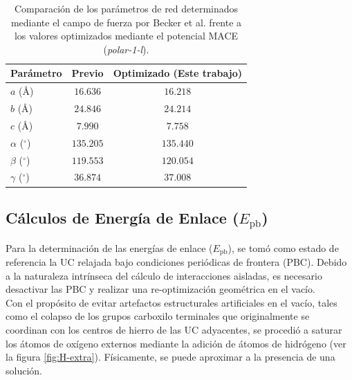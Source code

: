 \documentclass[12pt,letterpaper,oneside]{report}
\begin{document}
\begin{table}[h!]
\centering
\caption{Comparación de los parámetros de red determinados mediante el campo de fuerza por Becker et al. \cite{becker2016bhematin} frente a los valores optimizados mediante el potencial MACE (\textit{polar-1-l}).}
\label{tab:parametros_red}
\begin{tabular}{lcc}
\toprule
\textbf{Parámetro} & \textbf{Previo \cite{becker2016bhematin}} & \textbf{Optimizado (Este trabajo)} \\
\midrule
$a$ (\AA)       & $16.636$ & $16.218$ \\
$b$ (\AA)       & $24.846$ & $24.214$ \\
$c$ (\AA)       & $7.990$ & $7.758$  \\
$\alpha$ ($^\circ$) & $135.205$ & $135.440$ \\
$\beta$ ($^\circ$)  & $119.553$ & $120.054$ \\
$\gamma$ ($^\circ$) & $36.874$ & $37.008$  \\
\bottomrule
\end{tabular}
\end{table}

\subsection{Cálculos de Energía de Enlace ($E_{\text{pb}}$)}
\label{subsec:calculos_epb}

Para la determinación de las energías de enlace ($E_{\text{pb}}$), se tomó como estado de referencia la UC relajada bajo condiciones periódicas de frontera (PBC). Debido a la naturaleza intrínseca del cálculo de interacciones aisladas, es necesario desactivar las PBC y realizar una re-optimización geométrica en el vacío.\\ 

Con el propósito de evitar artefactos estructurales artificiales en el vacío, tales como el colapso de los grupos carboxilo terminales que originalmente se coordinan con los centros de hierro de las UC adyacentes, se procedió a saturar los átomos de oxígeno externos mediante la adición de átomos de hidrógeno (ver la figura \ref{fig:H-extra}). Físicamente, se puede aproximar a la presencia de una solución.\\
\end{document}
